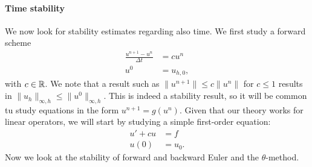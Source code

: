 \paragraph{Time stability}
We now look for stability estimates regarding also time. We first study a forward scheme 
\begin{equation}
    \begin{aligned}
        \displaystyle\frac{u^{n+1}-u^n}{\Delta t} &= cu^n\\
        u^0&= u_{h,0},
    \end{aligned}
\end{equation}
with $c\in \mathbb{R}$. We note that a result such as $\|u^{n+1}\|\leq c\|u^n\|$ for $c\leq 1$ results in $\|u_h\|_{\infty, h} \leq \|u^0\|_{\infty, h}$. This is indeed a stability result, so it will be common tu study equations in the form $u^{n+1} = g(u^n)$. Given that our theory works for linear operators, we will start by studying a simple first-order equation:
\begin{equation}
    \begin{aligned}
        u'+cu &= f\\
        u(0) &= u_0.
    \end{aligned}
\end{equation}
Now we look at the stability of forward and backward Euler and the $\theta$-method. 
